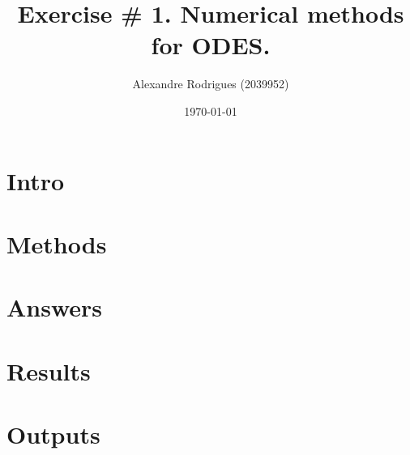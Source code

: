 \documentclass[a4paper, 11pt]{article}
\begin{document}
	
	\title{Exercise \# 1. Numerical methods for ODES. }
	\author{{\small Alexandre Rodrigues (2039952)}}
	\date{\today}
	
	\maketitle
	
	\section*{Intro}

	
	\section*{Methods}
	
	
	\section*{Answers}
	
	
	\section*{Results}

	
	\section*{Outputs}
	
	
	
\end{document}
